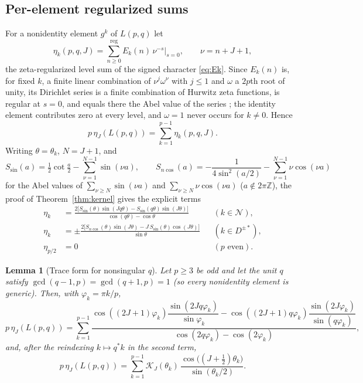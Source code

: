 \documentclass[11pt]{article}
\newtheorem{lemma}[theorem]{Lemma}
\theoremstyle{definition}
\newcommand{\Z}{\mathbb Z}
\newcommand{\cK}{\mathcal K}
\begin{document}
\subsection{Per-element regularized sums}

For a nonidentity element $g^k$ of $L(p,q)$ let
\begin{equation}
 \eta_k(p,q,J)=\sum_{n\geq0}^{\text{reg}}E_k(n)\,\nu^{-s}\Big|_{s=0},
 \qquad\nu=n+J+1,
 \label{eq:per-element-eta}
\end{equation}
the zeta-regularized level sum of the signed character
\eqref{eq:Ek}.  Since $E_k(n)$ is, for fixed $k$, a finite linear
combination of $\nu^j\omega^\nu$ with $j\leq1$ and $\omega$ a $2p$th root
of unity, its Dirichlet series is a finite combination of Hurwitz zeta
functions, is regular at $s=0$, and equals there the Abel value of the
series \cite[Lem.~5.4]{MahmoodP1Collection2026}; the identity element
contributes zero at every level, and $\omega=1$ never occurs for
$k\neq0$.  Hence
\begin{equation}
 p\,\eta_J(L(p,q))=\sum_{k=1}^{p-1}\eta_k(p,q,J).
 \label{eq:eta-as-element-sum}
\end{equation}
Writing $\theta=\theta_k$, $N=J+1$, and
\[
 S_{\sin}(a)=\tfrac12\cot\tfrac a2-\sum_{\nu=1}^{N-1}\sin(\nu a),\qquad
 S_{n\cos}(a)=-\frac1{4\sin^2(a/2)}-\sum_{\nu=1}^{N-1}\nu\cos(\nu a)
\]
for the Abel values of $\sum_{\nu\geq N}\sin(\nu a)$ and
$\sum_{\nu\geq N}\nu\cos(\nu a)$ ($a\notin2\pi\Z$), the proof of
Theorem~\ref{thm:kernel} gives the explicit terms
\begin{align}
 \eta_k&=\frac{2\bigl[S_{\sin}(\theta)\sin(Jq\theta)-S_{\sin}(q\theta)\sin(J\theta)\bigr]}
 {\cos(q\theta)-\cos\theta}
 &&(k\in\mathcal N),\label{eq:generic-element}\\
 \eta_k&=\pm\frac{2\bigl[S_{n\cos}(\theta)\sin(J\theta)-J\,S_{\sin}(\theta)\cos(J\theta)\bigr]}
 {\sin\theta}
 &&(k\in D^{\pm*}),\label{eq:clifford-element}\\
 \eta_{p/2}&=0&&(p\text{ even}).\nonumber
\end{align}

\begin{lemma}[Trace form for nonsingular $q$]
\label{lem:trace-form}
Let $p\geq3$ be odd and let the unit $q$ satisfy
$\gcd(q-1,p)=\gcd(q+1,p)=1$ (so every
nonidentity element is generic).  Then, with $\varphi_k=\pi k/p$,
\begin{equation}
 p\,\eta_J(L(p,q))=\sum_{k=1}^{p-1}
 \frac{\cos((2J+1)\varphi_k)\dfrac{\sin(2Jq\varphi_k)}{\sin\varphi_k}
 -\cos((2J+1)q\varphi_k)\dfrac{\sin(2J\varphi_k)}{\sin(q\varphi_k)}}
 {\cos(2q\varphi_k)-\cos(2\varphi_k)},
 \label{eq:E1}
\end{equation}
and, after the reindexing $k\mapsto q^*k$ in the second term,
\begin{equation}
 p\,\eta_J(L(p,q))=\sum_{k=1}^{p-1}
 \cK_J(\theta_k)\,\frac{\cos\bigl((J+\tfrac12)\theta_k\bigr)}{\sin(\theta_k/2)}.
 \label{eq:trace-form}
\end{equation}
\end{lemma}
\end{document}
